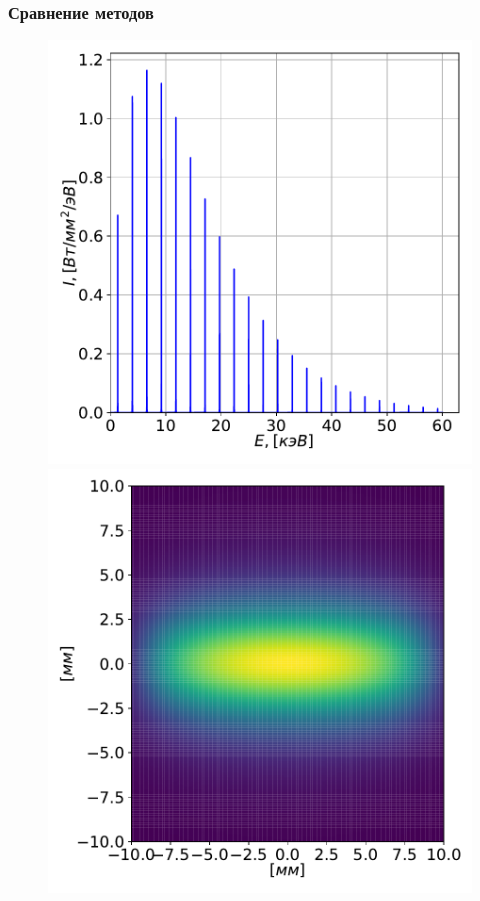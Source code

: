 \documentclass[14pt, hyperref = {colorlinks},xcolor=table ]{beamer}
\begin{document}
\small
\begin{frame}
\frametitle{Сравнение методов}\label{t1}
\vspace{-10pt}
\begin{figure}[h]
	\begin{minipage}[h]{0.49\linewidth}
	\includegraphics[width=0.99\linewidth]{pic/Spec_1-1.pdf}
	\end{minipage}
	\begin{minipage}[h]{0.49\linewidth}
		\includegraphics[width=0.99\linewidth]{pic/power_dens_1-1_2d.pdf}

\end{minipage}
\end{figure}
\end{frame}
\end{document}
